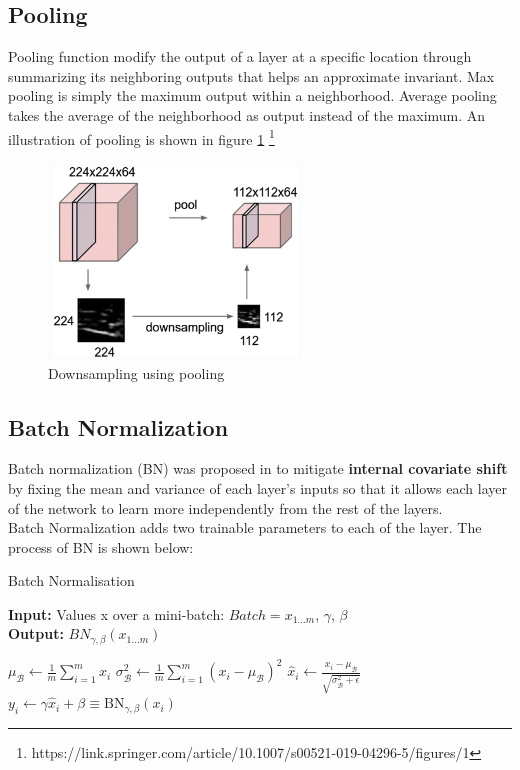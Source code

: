 \subsection{Pooling}
Pooling function modify the output of a layer at a specific location through summarizing its neighboring outputs that helps an approximate invariant. Max pooling is simply the maximum output within a neighborhood. Average pooling takes the average of the neighborhood as output instead of the maximum. An illustration of pooling is shown in figure \ref{fig:pooling}
\footnote{https://link.springer.com/article/10.1007/s00521-019-04296-5/figures/1}
\begin{figure}[h]
	\centering
	\includegraphics[width=0.6\textwidth]{img/background_img/pooling_img}
	\caption{Downsampling using pooling}
	\label{fig:pooling}
\end{figure}

\subsection{Batch Normalization}
Batch normalization (BN) was proposed in \cite{BatchNorm} to mitigate \textbf{internal covariate shift} by fixing the mean and variance of each layer's inputs so that it allows each layer of the network to learn more independently from the rest of the layers.\\

Batch Normalization adds two trainable parameters to each of the layer. The process of BN is shown below:
\begin{algorithm}
    \caption{Batch Normalisation}\label{BatchNorm}
    \hspace*{\algorithmicindent} \textbf{Input:} Values x over a mini-batch: $Batch = {x_{1...m}}$, $\gamma$, $\beta$\\
    \hspace*{\algorithmicindent} \textbf{Output:} $BN_{\gamma,\beta}(x_{1...m})$
    \begin{algorithmic}[]
    \State $\mu_{\mathcal{B}} \gets \frac{1}{m} \sum_{i=1}^{m} x_{i}$    
    \State $\sigma_{\mathcal{B}}^{2} \leftarrow \frac{1}{m} \sum_{i=1}^{m}\left(x_{i}-\mu_{\mathcal{B}}\right)^{2}$
    \State {}
    \State $\widehat{x}_{i} \leftarrow \frac{x_{i}-\mu_{\mathcal{B}}}{\sqrt{\sigma_{\mathcal{B}}^{2}+\epsilon}}$  
    \State {}
    \State $y_{i} \leftarrow \gamma \widehat{x}_{i}+\beta \equiv \mathrm{B} \mathrm{N}_{\gamma, \beta}\left(x_{i}\right)$
    \end{algorithmic}
    \end{algorithm}

